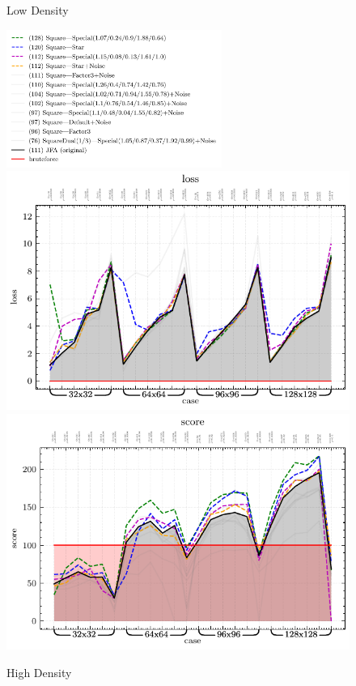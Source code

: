 \documentclass[format=acmsmall,screen,review,authordraft,nonacm]{acmart}
\begin{document}
\begin{figure}[H]
\begin{minipage}{0.48\textwidth}
		\caption{Low Density}
		\label{Fig:noise}
	\end{minipage}\hfill
	\begin{minipage}{0.48\textwidth}
		\centering
		\includegraphics[height=4.5cm]{../figures/results-small-high/legend}
		\includegraphics[width=1\linewidth]{../figures/results-small-high/figure-2-loss}
		\includegraphics[width=1\linewidth]{../figures/results-small-high/figure-3-score}
		\caption{High Density}
		\label{Fig:lnoise}
	\end{minipage}
\end{figure}
\end{document}
